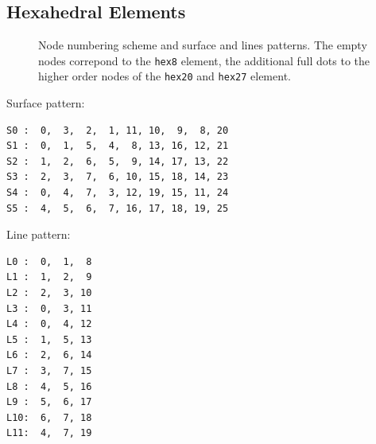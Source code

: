 \subsection{Hexahedral Elements}

\begin{figure}[h!]
\begin{center}
\caption{Node numbering scheme and surface and lines patterns. The empty nodes correpond to the \texttt{hex8} element, the additional full dots to the higher order nodes of the \texttt{hex20} and \texttt{hex27} element.}
\label{fig:conventions:hex}
\end{center}
\end{figure}

Surface pattern:
\begin{verbatim}
S0 :  0,  3,  2,  1, 11, 10,  9,  8, 20
S1 :  0,  1,  5,  4,  8, 13, 16, 12, 21
S2 :  1,  2,  6,  5,  9, 14, 17, 13, 22
S3 :  2,  3,  7,  6, 10, 15, 18, 14, 23
S4 :  0,  4,  7,  3, 12, 19, 15, 11, 24
S5 :  4,  5,  6,  7, 16, 17, 18, 19, 25
\end{verbatim}

Line pattern:
\begin{verbatim}
L0 :  0,  1,  8
L1 :  1,  2,  9
L2 :  2,  3, 10
L3 :  0,  3, 11
L4 :  0,  4, 12
L5 :  1,  5, 13
L6 :  2,  6, 14
L7 :  3,  7, 15
L8 :  4,  5, 16
L9 :  5,  6, 17
L10:  6,  7, 18
L11:  4,  7, 19
\end{verbatim}


